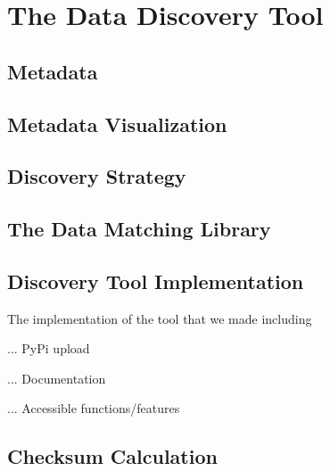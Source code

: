 \chapter{The Data Discovery Tool}\label{ch:ch2label}


\section{Metadata}\label{sec:metadata}


\section{Metadata Visualization}\label{sec:metadata-visualization}



\section{Discovery Strategy}\label{sec:discovery-strategy}



\section{The Data Matching Library}\label{sec:the-data-matching-library}



\section{Discovery Tool Implementation}\label{sec:discovery-tool-implementation}
The implementation of the tool that we made including

... PyPi upload

... Documentation

... Accessible functions/features



\section{Checksum Calculation}\label{sec:checksum-calculation}


